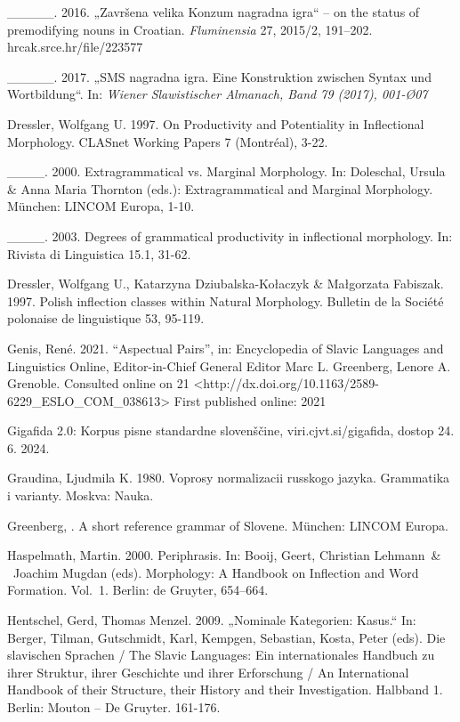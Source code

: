 \documentclass[output=paper]{langscibook}
\begin{document}
\_\_\_\_\_. 2016. „Završena velika Konzum nagradna igra“ – on the status of premodifying nouns in Croatian. \textit{Fluminensia} 27, 2015/2, 191–202. hrcak.srce.hr/file/223577

\_\_\_\_\_. 2017. „SMS nagradna igra. Eine Konstruktion zwischen Syntax und Wortbildung“. In: \textit{Wiener Slawistischer Almanach, Band 79 (2017), 001-Ø07}

Dressler, Wolfgang U. 1997. On Productivity and Potentiality in Inflectional Morphology. CLASnet Working Papers 7 (Montréal), 3-22.

\_\_\_\_. 2000. Extragrammatical vs. Marginal Morphology. In: Doleschal, Ursula \& Anna Maria Thornton (eds.): Extragrammatical and Marginal Morphology. München: LINCOM Europa, 1-10.

\_\_\_\_. 2003. Degrees of grammatical productivity in inflectional morphology. In: Rivista di Linguistica 15.1, 31-62.

Dressler, Wolfgang U., Katarzyna Dziubalska-Kołaczyk \& Małgorzata Fabiszak. 1997. Polish inflection classes within Natural Morphology. Bulletin de la Société polonaise de linguistique 53, 95-119. 

Genis, René. 2021. “Aspectual Pairs”, in: Encyclopedia of Slavic Languages and Linguistics Online, Editor-in-Chief General Editor Marc L. Greenberg, Lenore A. Grenoble. Consulted online on 21 \citealt{November2023} <http://dx.doi.org/10.1163/2589-6229\_ESLO\_COM\_038613> First published online: 2021

Gigafida 2.0: Korpus pisne standardne slovenščine, viri.cjvt.si/gigafida, dostop 24. 6. 2024.

Graudina, Ljudmila K. 1980. Voprosy normalizacii russkogo jazyka. Grammatika i varianty. Moskva: Nauka.

Greenberg, \citealt{Marc2008}. A short reference grammar of Slovene. München: LINCOM Europa.

\begin{styleLiteraturangabe}
Haspelmath, Martin. 2000. Periphrasis. In: Booij, Geert, Christian Lehmann~\& ~Joachim Mugdan (eds). Morphology: A Handbook on Inflection and Word Formation. Vol.~1. Berlin: de Gruyter, 654–664.
\end{styleLiteraturangabe}

Hentschel, Gerd, Thomas Menzel. 2009. „Nominale Kategorien: Kasus.“ In: Berger, Tilman, Gutschmidt, Karl, Kempgen, Sebastian, Kosta, Peter (eds). Die slavischen Sprachen / The Slavic Languages: Ein internationales Handbuch zu ihrer Struktur, ihrer Geschichte und ihrer Erforschung / An International Handbook of their Structure, their History and their Investigation. Halbband 1. Berlin: Mouton – De Gruyter. 161-176.
\end{document}
